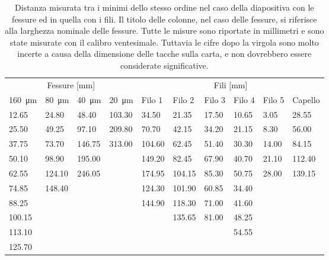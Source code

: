 \begin{table}[t!]
    \centering
    \footnotesize
    \begin{tabular}{l l l l | l l l l l l}
        \toprule
        \multicolumn{4}{c|}{Fessure [mm]} & \multicolumn{6}{c}{Fili [mm]}  \\
        \SI{160}{\micro\metre}& \SI{80}{\micro\metre}& \SI{40}{\micro\metre}& \SI{20}{\micro\metre}&
        Filo 1&  Filo 2&  Filo 3& Filo 4& Filo 5& Capello \\[1mm]
        \midrule
        12.65&     24.80&    48.40&   103.30& 34.50&    21.35&   17.50&  10.65&  3.05&   28.55  \\
        25.50&     49.25&    97.10&   209.80& 70.70&    42.15&   34.20&  21.15&  8.30&   56.00  \\
        37.75&     73.70&   146.75&   313.00& 104.60&   62.45&   51.40&  30.30&  14.00&  84.15  \\
        50.10&     98.90&   195.00&         & 149.20&   82.45&   67.90&  40.70&  21.10&  112.40 \\
        62.55&    124.10&   246.05&         & 174.95&   104.15&  85.30&  50.75&  28.00&  139.15 \\
        74.85&    148.40&&                  & 124.30&   101.90&  60.85&  34.40&       &         \\      
        88.25&&&                            & 144.90&   118.30&  71.00&  41.60&       &         \\
        100.15&&&                           &       &   135.65&  81.00&  48.25&       &         \\
        113.10&&&                           &       &        &       &   54.55&       &         \\
        125.70&&&                           &       &        &       &        &       &         \\
        \bottomrule
    \end{tabular}
    \caption{Distanza misurata tra i minimi dello stesso ordine nel caso della diapositiva con le fessure ed
        in quella con i fili. Il titolo delle colonne, nel caso delle fessure, si riferisce alla larghezza nominale delle fessure.
        Tutte le misure sono riportate in millimetri e sono state misurate con il calibro ventesimale. Tuttavia
        le cifre dopo la virgola sono molto incerte a causa della dimensione delle tacche sulla carta, e non dovrebbero
        essere considerate significative.}
    \label{tab:ff}
\end{table}

